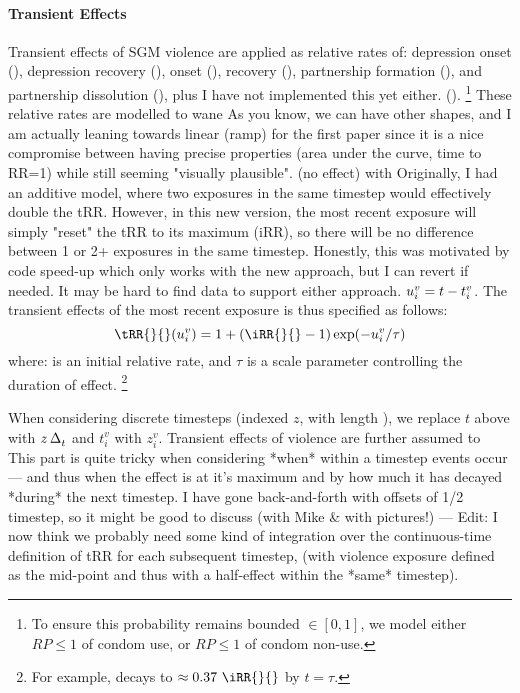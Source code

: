 \paragraph{Transient Effects}
Transient effects of SGM violence are applied as relative rates of:
depression onset (),
depression recovery (),
\hazdrink onset (),
\hazdrink recovery (),
partnership formation (), and
partnership dissolution (), plus
     {I have not implemented this yet either.}
().%
\footnote{To ensure this probability remains bounded $\in [0,1]$,
  we model either $RP \le 1$ of condom use, or $RP \le 1$ of condom non-use.}
These relative rates are modelled to wane
     {As you know, we can have other shapes,
      and I am actually leaning towards linear (ramp)
      for the first paper since it is a nice compromise between
      having precise properties (area under the curve, time to RR=1)
      while still seeming "visually plausible".}
(\ie no effect) with
     {Originally, I had an additive model,
      where two exposures in the same timestep would effectively double the tRR.
      However, in this new version, the most recent exposure
      will simply "reset" the tRR to its maximum (iRR),
      so there will be no difference between 1 or 2+ exposures in the same timestep.
      Honestly, this was motivated by code speed-up
      which only works with the new approach, but I can revert if needed.
      It may be hard to find data to support either approach.}
$u^v_i = t - t^v_i$.
The transient effects of the most recent exposure is thus specified as follows:
\begin{equation}\label{eq:tRR}
  \tRR{}{}(\du^v_i) = 1+(\iRR{}{}-1)\exp(-\du^v_i/\tau)
\end{equation}
where:
\iRR{}{} is an initial relative rate, and
$\tau$ is a scale parameter controlling the duration of effect.%
\footnote{For example, \tRR{}{} decays to $\approx 0.37~\iRR{}{}$ by $t = \tau$.}
\par
When considering discrete timesteps (indexed $z$, with length \dt),
we replace $t$ above with $z\,\Delta_t^{}$ and $t^v_i$ with $z^v_i$.
Transient effects of violence are further assumed to
     {This part is quite tricky when considering
      *when* within a timestep events occur ---
      and thus when the effect is at it's maximum
      and by how much it has decayed *during* the next timestep.
      I have gone back-and-forth with offsets of 1/2 timestep,
      so it might be good to discuss (with Mike \& with pictures!)
      --- Edit: I now think we probably need some kind of integration
      over the continuous-time definition of tRR for each subsequent timestep,
      (with violence exposure defined as the mid-point
      and thus with a half-effect within the *same* timestep).}
